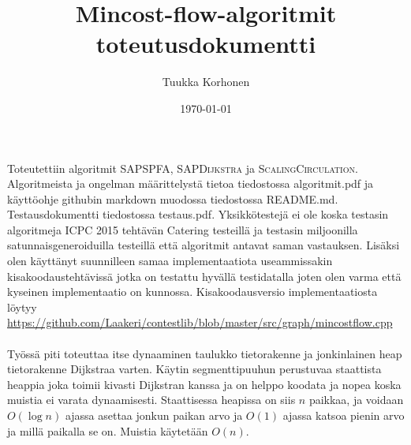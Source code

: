 \documentclass[a4paper, 11pt]{article}
\title{Mincost-flow-algoritmit toteutusdokumentti}
\author{Tuukka Korhonen}
\date{\today}
\begin{document}
\maketitle
\noindent
Toteutettiin algoritmit \textsc{SAPSPFA}, \textsc{SAPDijkstra} ja \textsc{ScalingCirculation}.
Algoritmeista ja ongelman määrittelystä tietoa tiedostossa algoritmit.pdf ja käyttöohje
githubin markdown muodossa tiedostossa README.md. Testausdokumentti tiedostossa testaus.pdf.
Yksikkötestejä ei ole koska testasin algoritmeja ICPC 2015 tehtävän Catering testeillä
ja testasin miljoonilla satunnaisgeneroiduilla testeillä että algoritmit antavat
saman vastauksen.
Lisäksi olen käyttänyt suunnilleen samaa implementaatiota useammissakin kisakoodaustehtävissä
jotka on testattu hyvällä testidatalla joten olen varma että kyseinen implementaatio
on kunnossa. Kisakoodausversio implementaatiosta löytyy \hyperref[https://github.com/Laakeri/contestlib/blob/master/src/graph/mincostflow.cpp]{https://github.com/Laakeri/contestlib/blob/master/src/graph/mincostflow.cpp}
\\\\
\noindent
Työssä piti toteuttaa itse dynaaminen taulukko tietorakenne ja jonkinlainen heap
tietorakenne Dijkstraa varten. Käytin segmenttipuuhun perustuvaa staattista heappia
joka toimii kivasti Dijkstran kanssa ja on helppo koodata ja nopea koska muistia ei varata dynaamisesti. 
Staattisessa 
heapissa on siis $n$ paikkaa, ja voidaan $O(\log n)$ ajassa asettaa jonkun paikan arvo
ja $O(1)$ ajassa katsoa pienin arvo ja millä paikalla se on. Muistia käytetään $O(n)$.
\end{document}
